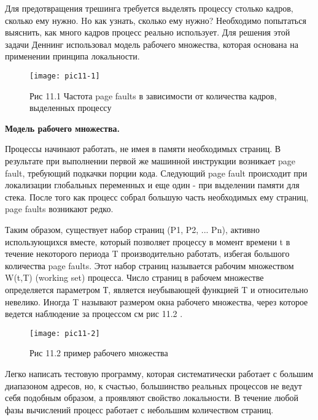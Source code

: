 Для предотвращения трешинга требуется выделять процессу столько кадров, сколько ему нужно. Hо как узнать, сколько ему нужно? Необходимо попытаться выяснить, как много кадров процесс реально использует. Для решения этой задачи Деннинг использовал модель рабочего множества, которая основана на применении принципа локальности.

\begin{figure}
  \begin{center}
  \texttt{[image: pic11-1]}
  \caption{Рис 11.1 Частота page faults в зависимости от количества кадров, выделенных процессу}
  \end{center}
\end{figure}

\newpage
\begin{center}{\bfseries Модель рабочего множества.}
\end{center}

Процессы начинают работать, не имея в памяти необходимых страниц. В результате при выполнении первой же машинной инструкции возникает page fault, требующий подкачки порции кода. Следующий page fault происходит при локализации глобальных переменных и еще один - при выделении памяти для стека. После того как процесс собрал большую часть необходимых ему страниц, page faults возникают редко.

Таким образом, существует набор страниц (P1, P2, ... Pn), активно использующихся вместе, который позволяет процессу в момент времени t в течение некоторого периода T производительно работать, избегая большого количества page faults. Этот набор страниц называется рабочим множеством W(t,T) (working set) процесса. Число страниц в рабочем множестве определяется параметром Т, является неубывающей функцией T и относительно невелико. Иногда T называют размером окна рабочего множества, через которое ведется наблюдение за процессом см рис 11.2 .


\begin{figure}[h]
  \begin{center}
  \texttt{[image: pic11-2]}
  \caption{Рис 11.2 пример рабочего множества}
  \end{center}
\end{figure}


Легко написать тестовую программу, которая систематически работает с большим диапазоном адресов, но, к счастью, большинство реальных процессов не ведут себя подобным образом, а проявляют свойство локальности. В течение любой фазы вычислений процесс работает с небольшим количеством страниц.

